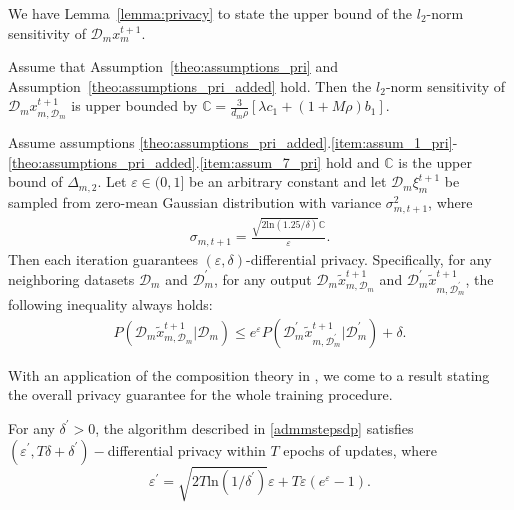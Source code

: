 We have Lemma~\ref{lemma:privacy} to state the upper bound of the $l_2$-norm sensitivity of $\mathcal{D}_mx_m^{t+1}$.
\begin{lemma}
\label{lemma:privacy}
  Assume that Assumption~\ref{theo:assumptions_pri} and Assumption~\ref{theo:assumptions_pri_added} hold.
Then the $l_2$-norm sensitivity of $\mathcal{D}_mx_{m,\mathcal{D}_m}^{t+1}$ is upper bounded by $\mathbb{C}=\frac{3}{d_m\rho}\left[\lambda c_1+(1+M\rho)b_1\right]$.
\end{lemma}

\begin{theorem}\label{theo:DP}
  Assume assumptions \ref{theo:assumptions_pri_added}.\ref{item:assum_1_pri}-\ref{theo:assumptions_pri_added}.\ref{item:assum_7_pri} hold and $\mathbb{C}$ is the 
  upper bound of $\Delta_{m,2}$. Let $\varepsilon\in(0,1]$ be an arbitrary constant and let
  $\mathcal{D}_m\xi_m^{t+1}$ be sampled from zero-mean Gaussian distribution with variance $\sigma_{m,t+1}^2$,
  where
  \begin{eqnarray*}
    \sigma_{m,t+1}=\frac{\sqrt{2\text{ln}(1.25/\delta)}\mathbb{C}}{\varepsilon}.
  \end{eqnarray*}
  Then each iteration guarantees $(\varepsilon,\delta)$-differential privacy. Specifically,
  for any neighboring datasets $\mathcal{D}_m$ and $\mathcal{D}_m^{\prime}$, for any output
  $\mathcal{D}_m\tilde{x}_{m,\mathcal{D}_m}^{t+1}$ and $\mathcal{D}_m^{\prime}\tilde{x}_{m,\mathcal{D}_m^{\prime}}^{t+1}$, the following inequality always holds:
  \begin{eqnarray*}
    P(\mathcal{D}_m\tilde{x}_{m,\mathcal{D}_m}^{t+1}|\mathcal{D}_m)\leq e^{\varepsilon}
    P(\mathcal{D}_m^{\prime}\tilde{x}_{m,\mathcal{D}_m^{\prime}}^{t+1}|\mathcal{D}_m^{\prime})
    +\delta.
  \end{eqnarray*}
\end{theorem}

With an application of the composition theory in \cite{dwork2014algorithmic}, we come to a result stating the overall privacy guarantee for the whole training procedure.
\begin{coro}
  For any $\delta^{\prime}>0$, the algorithm described in \eqref{admmstepsdp} satisfies $(\varepsilon^{\prime}, T\delta+\delta^{\prime})-$differential privacy within $T$ epochs of updates, where
  \begin{equation}
    \varepsilon^{\prime}=\sqrt{2T\text{ln}(1/\delta^{\prime})}\varepsilon+T\varepsilon(e^\varepsilon - 1).
  \end{equation}
\end{coro}
